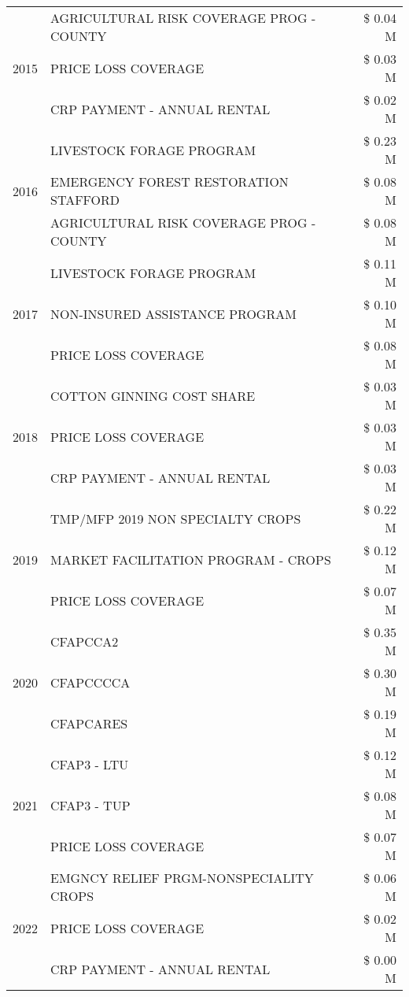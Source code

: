 \begin{tabular}{llr}
\cline{1-3}
\multirow[t]{3}{*}{2015} & AGRICULTURAL RISK COVERAGE PROG - COUNTY & \$ 0.04 M \\
 & PRICE LOSS COVERAGE & \$ 0.03 M \\
 & CRP PAYMENT - ANNUAL RENTAL & \$ 0.02 M \\
\cline{1-3}
\multirow[t]{3}{*}{2016} & LIVESTOCK FORAGE PROGRAM & \$ 0.23 M \\
 & EMERGENCY FOREST RESTORATION STAFFORD & \$ 0.08 M \\
 & AGRICULTURAL RISK COVERAGE PROG - COUNTY & \$ 0.08 M \\
\cline{1-3}
\multirow[t]{3}{*}{2017} & LIVESTOCK FORAGE PROGRAM & \$ 0.11 M \\
 & NON-INSURED ASSISTANCE PROGRAM & \$ 0.10 M \\
 & PRICE LOSS COVERAGE & \$ 0.08 M \\
\cline{1-3}
\multirow[t]{3}{*}{2018} & COTTON GINNING COST SHARE & \$ 0.03 M \\
 & PRICE LOSS COVERAGE & \$ 0.03 M \\
 & CRP PAYMENT - ANNUAL RENTAL & \$ 0.03 M \\
\cline{1-3}
\multirow[t]{3}{*}{2019} & TMP/MFP 2019 NON SPECIALTY CROPS & \$ 0.22 M \\
 & MARKET FACILITATION PROGRAM - CROPS & \$ 0.12 M \\
 & PRICE LOSS COVERAGE & \$ 0.07 M \\
\cline{1-3}
\multirow[t]{3}{*}{2020} & CFAPCCA2 & \$ 0.35 M \\
 & CFAPCCCCA & \$ 0.30 M \\
 & CFAPCARES & \$ 0.19 M \\
\cline{1-3}
\multirow[t]{3}{*}{2021} & CFAP3 - LTU & \$ 0.12 M \\
 & CFAP3 - TUP & \$ 0.08 M \\
 & PRICE LOSS COVERAGE & \$ 0.07 M \\
\cline{1-3}
\multirow[t]{3}{*}{2022} & EMGNCY RELIEF PRGM-NONSPECIALITY CROPS & \$ 0.06 M \\
 & PRICE LOSS COVERAGE & \$ 0.02 M \\
 & CRP PAYMENT - ANNUAL RENTAL & \$ 0.00 M \\
\cline{1-3}
\bottomrule
\end{tabular}
